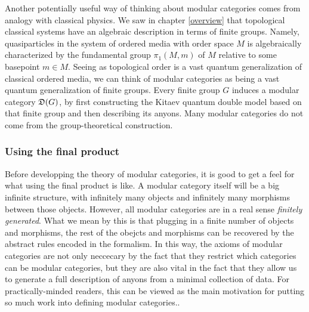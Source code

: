 \begin{rem}
Another potentially useful way of thinking about modular categories comes from analogy with classical physics. We saw in chapter \ref{overview} that topological classical systems have an algebraic description in terms of finite groups. Namely, quasiparticles in the system of ordered media with order space $M$ is algebraically characterized by the fundamental group $\pi_1(M,m)$ of $M$ relative to some basepoint $m\in M$. Seeing as topological order is a vast quantum generalization of classical ordered media, we can think of modular categories as being a vast quantum generalization of finite groups. Every finite group $G$ induces a modular category ${\mathfrak D}(G)$, by first constructing the Kitaev quantum double model based on that finite group and then describing its anyons. Many modular categories do not come from the group-theoretical construction.
\end{rem}

\subsubsection{Using the final product}

Before developping the theory of modular categories, it is good to get a feel for what using the final product is like. A modular category itself will be a big infinite structure, with infinitely many objects and infinitely many morphisms between those objects. However, all modular categories are in a real sense {\em finitely generated}. What we mean by this is that plugging in a finite number of objects and morphisms, the rest of the obejcts and morphisms can be recovered by the abstract rules encoded in the formalism. In this way, the axioms of modular categories are not only neccecary by the fact that they restrict which categories can be modular categories, but they are also vital in the fact that they allow us to generate a full description of anyons from a minimal collection of data. For practically-minded readers, this can be viewed as the main motivation for putting so much work into defining modular categories..

